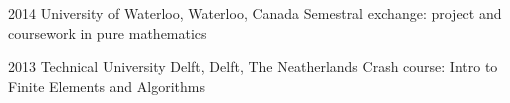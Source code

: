 

\begin{cvskills}

  \cvskill
    {2014} %
    {University of Waterloo, Waterloo, Canada} %
    {Semestral exchange: project and coursework in pure mathematics} %

  \cvskill
    {2013} %
    {Technical University Delft, Delft, The Neatherlands} %
    {Crash course: Intro to Finite Elements and Algorithms} %


\end{cvskills}






